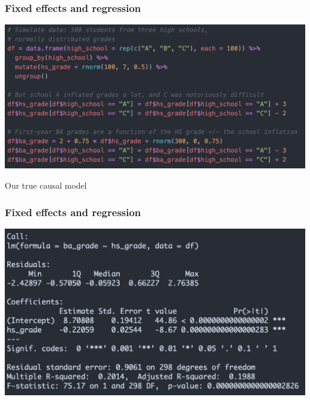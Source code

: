 \documentclass[aspectratio=43]{beamer}
\begin{document}
\begin{frame}
\frametitle{Fixed effects and regression}
\centering

\includegraphics[width = \textwidth]{../img/fe_data}

Our true causal model

\end{frame}

\begin{frame}
\frametitle{Fixed effects and regression}
\centering

\includegraphics[width = \textwidth]{../img/fe_lm1}

\end{frame}
\end{document}
